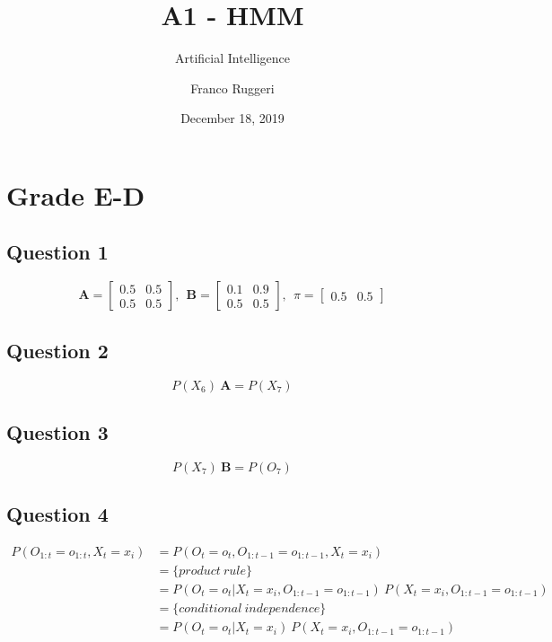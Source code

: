 \documentclass{scrartcl}
\title{A1 - HMM}
\subtitle{Artificial Intelligence}
\author{Franco Ruggeri}
\date{December 18, 2019}
\begin{document}
\maketitle

\section{Grade E-D}

\subsection{Question 1}

\begin{equation}
 \mathbf{A} = 
 \begin{bmatrix}
  0.5 & 0.5 \\
  0.5 & 0.5
 \end{bmatrix} 
 ,\ \ \mathbf{B} = 
 \begin{bmatrix}
  0.1 & 0.9 \\
  0.5 & 0.5
 \end{bmatrix} 
 ,\ \ \pi = 
 \begin{bmatrix}
  0.5 & 0.5
 \end{bmatrix} 
\end{equation}

\subsection{Question 2}

\begin{equation}
 P(X_6)\ \mathbf{A} = P(X_7)
\end{equation}
 
\subsection{Question 3}

\begin{equation}
 P(X_7)\ \mathbf{B} = P(O_7)
\end{equation}

\subsection{Question 4}

\begin{align}
 P(O_{1:t}=o_{1:t}, X_t=x_i) &= P(O_t=o_t, O_{1:t-1}=o_{1:t-1}, X_t=x_i) \nonumber \\
 &= \{product\ rule\} \nonumber \\
 &= P(O_t=o_t | X_t=x_i, O_{1:t-1}=o_{1:t-1})\ P(X_t=x_i, O_{1:t-1}=o_{1:t-1}) \nonumber \\
 &= \{conditional\ independence\} \nonumber \\
 &= P(O_t=o_t | X_t=x_i)\ P(X_t=x_i, O_{1:t-1}=o_{1:t-1})
\end{align}
\end{document}
